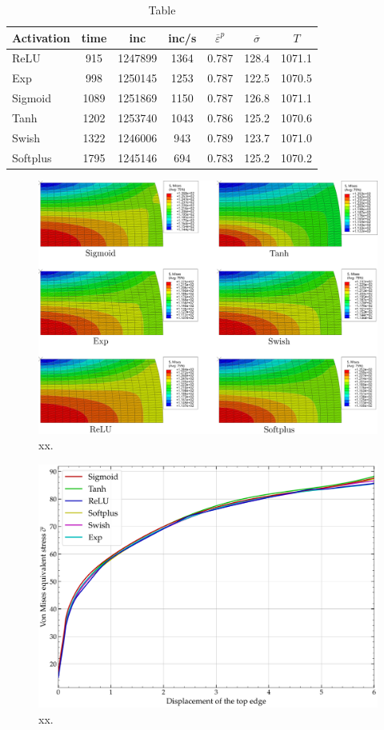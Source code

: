 \documentclass[algorithms,article,submit,pdftex,moreauthors]{Definitions/mdpi}
\begin{document}
\begin{table}[H]
\caption{Table}
\begin{tabular}{lcccccc}
\toprule
Activation & time & inc & inc/s & $\overline{\varepsilon}^p$ & $\overline{\sigma}$ & $T$\\ \midrule
ReLU & 915 & 1247899 & 1364 & 0.787 & 128.4 & 1071.1 \\
Exp & 998 & 1250145 & 1253 & 0.787 &122.5 &1070.5 \\
Sigmoid & 1089 & 1251869 & 1150 & 0.787 & 126.8 & 1071.1 \\
Tanh & 1202 & 1253740 & 1043 & 0.786 & 125.2 & 1070.6 \\ 
Swish & 1322 & 1246006 & 943 & 0.789 & 123.7 & 1071.0 \\
Softplus & 1795 & 1245146 & 694 & 0.783 & 125.2 & 1070.2 \\
\bottomrule
\end{tabular}
\end{table}

\begin{figure}[h]
\centering
\includegraphics[width=0.8\columnwidth]{Figures/MisesHalf}
\caption{xx.}
\label{fig:Num-misesCP}
\end{figure}

\begin{figure}[h]
\centering
\includegraphics[width=0.8\columnwidth]{Figures/vonMises}
\caption{xx.}
\label{fig:Num-misesTH}
\end{figure}
\end{document}
